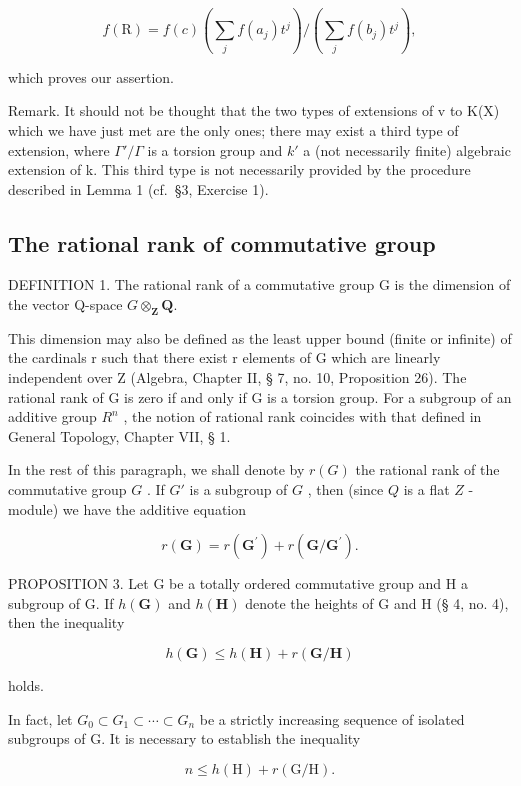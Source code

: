 \[
f (\mathrm{R}) = f (c) \left(\sum_ {j} f (a _ {j}) t ^ {j}\right) / \left(\sum_ {j} f (b _ {j}) t ^ {j}\right),
\]

which proves our assertion.

Remark. It should not be thought that the two types of extensions of v to K(X) which we have just met are the only ones; there may exist a third type of extension, where \(\Gamma'/\Gamma\) is a torsion group and \(k'\) a (not necessarily finite) algebraic extension of k. This third type is not necessarily provided by the procedure described in Lemma 1 (cf.~§3, Exercise 1).

\subsection{The rational rank of commutative group}

DEFINITION 1. The rational rank of a commutative group G is the dimension of the vector Q-space \(G \otimes_{\mathbf{Z}} \mathbf{Q}\).

This dimension may also be defined as the least upper bound (finite or infinite) of the cardinals r such that there exist r elements of G which are linearly independent over Z (Algebra, Chapter II, § 7, no. 10, Proposition 26). The rational rank of G is zero if and only if G is a torsion group. For a subgroup of an additive group \(R^{n}\) , the notion of rational rank coincides with that defined in General Topology, Chapter VII, § 1.

In the rest of this paragraph, we shall denote by \(r(G)\) the rational rank of the commutative group \(G\) . If \(G'\) is a subgroup of \(G\) , then (since \(Q\) is a flat \(Z\) -module) we have the additive equation

\[
r (\mathbf {G}) = r \left(\mathbf {G} ^ {\prime}\right) + r \left(\mathbf {G} / \mathbf {G} ^ {\prime}\right).\tag{4}
\]

PROPOSITION 3. Let G be a totally ordered commutative group and H a subgroup of G. If \(h(\mathbf{G})\) and \(h(\mathbf{H})\) denote the heights of G and H (§ 4, no. 4), then the inequality

\[
h (\mathbf {G}) \leqslant h (\mathbf {H}) + r (\mathbf {G} / \mathbf {H})\tag{5}
\]

holds.

In fact, let \(G_{0} \subset G_{1} \subset \cdots \subset G_{n}\) be a strictly increasing sequence of isolated subgroups of G. It is necessary to establish the inequality

\[
n \leqslant h (\mathrm{H}) + r (\mathrm{G} / \mathrm{H}).\tag{6}
\]

